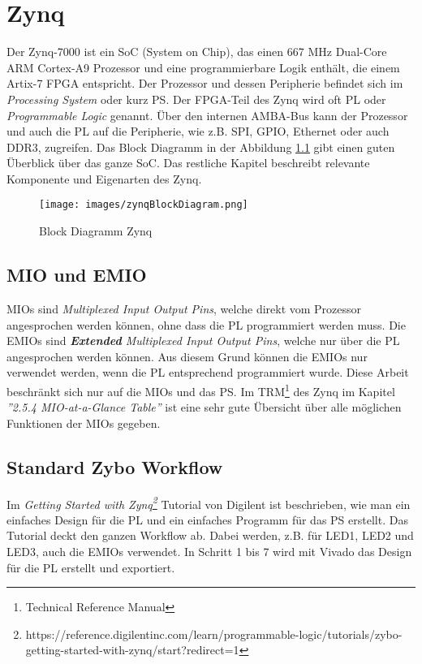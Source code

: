 
\chapter{Zynq}
Der Zynq-7000 ist ein SoC (System on Chip), das einen 667 MHz Dual-Core ARM Cortex-A9 Prozessor und eine programmierbare Logik enthält, die einem Artix-7 FPGA entspricht.
Der Prozessor und dessen Peripherie befindet sich im \textit{Processing System} oder kurz PS.
Der FPGA-Teil des Zynq wird oft PL oder \textit{Programmable Logic} genannt.
Über den internen AMBA-Bus kann der Prozessor und auch die PL auf die Peripherie, wie z.B. SPI, GPIO, Ethernet oder auch DDR3, zugreifen.
Das Block Diagramm in der Abbildung \ref{fig:BlockDiagrammZynq} gibt einen guten Überblick über das ganze SoC.
Das restliche Kapitel beschreibt relevante Komponente und Eigenarten des Zynq.

\begin{figure}[htbp]
	\centering
		\texttt{[image: images/zynqBlockDiagram.png]}
	\caption[Block Diagramm Zynq]{Block Diagramm Zynq\footnotemark}
	\label{fig:BlockDiagrammZynq}
\end{figure}


\section{MIO und EMIO}
MIOs sind \textit{Multiplexed Input Output Pins}, welche direkt vom Prozessor angesprochen werden können, ohne dass die PL programmiert werden muss.
Die EMIOs sind \textit{\textbf{Extended} Multiplexed Input Output Pins}, welche nur über die PL angesprochen werden können.
Aus diesem Grund können die EMIOs nur verwendet werden, wenn die PL entsprechend programmiert wurde.
Diese Arbeit beschränkt sich nur auf die MIOs und das PS.
Im TRM\footnote{Technical Reference Manual} des Zynq\cite{bib:ZynqTechnicalReferenceManual} im Kapitel \textit{''2.5.4 MIO-at-a-Glance Table''} ist eine sehr gute Übersicht über alle möglichen Funktionen der MIOs gegeben.


\section{Standard Zybo Workflow}
Im \textit{Getting Started with Zynq\footnote{https://reference.digilentinc.com/learn/programmable-logic/tutorials/zybo-getting-started-with-zynq/start?redirect=1}} Tutorial von Digilent ist beschrieben, wie man ein einfaches Design für die PL und ein einfaches Programm für das PS erstellt.
Das Tutorial deckt den ganzen Workflow ab.
Dabei werden, z.B. für LED1, LED2 und LED3, auch die EMIOs verwendet.
In Schritt 1 bis 7 wird mit Vivado das Design für die PL erstellt und exportiert.


